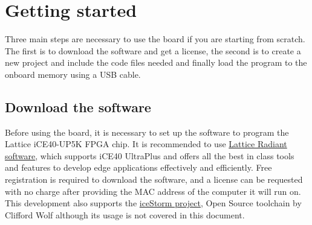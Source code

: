 \documentclass[11pt, a4paper, oneside]{article}
\begin{document}
\section{Getting started}
Three main steps are necessary to use the board if you are starting from scratch. The first is to download the software and get a license, the second is to create a new project and include the code files needed and finally load the program to the onboard memory using a USB cable.

\subsection{Download the software}
Before using the board, it is necessary to set up the software to program the Lattice iCE40-UP5K FPGA chip. It is recommended to use \href{http://www.latticesemi.com/Products/DesignSoftwareAndIP/FPGAandLDS/Radiant}{Lattice Radiant software}, which supports iCE40 UltraPlus and offers all the best in class tools and features to develop edge applications effectively and efficiently. Free registration is required to download the software, and a license can be requested with no charge after providing the MAC address of the computer it will run on. 
This development also supports the \href{http://www.clifford.at/icestorm/}{iceStorm project}, Open Source toolchain by Clifford Wolf although its usage is not covered in this document.
\end{document}
